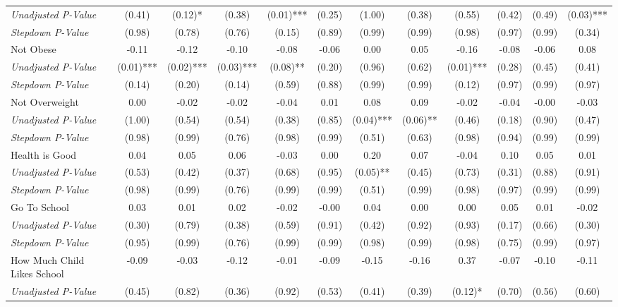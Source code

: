\begin{tabular}{l c c c c c c c c c c c}
\quad \textit{Unadjusted P-Value} & (0.41) & (0.12)* & (0.38) & (0.01)*** & (0.25) & (1.00) & (0.38) & (0.55) & (0.42) & (0.49) & (0.03)*** \\
\quad \textit{Stepdown P-Value} & (0.98) & (0.78) & (0.76) & (0.15) & (0.89) & (0.99) & (0.99) & (0.98) & (0.97) & (0.99) & (0.34) \\
Not Obese & -0.11 & -0.12 & -0.10 & -0.08 & -0.06 & 0.00 & 0.05 & -0.16 & -0.08 & -0.06 & 0.08 \\
\quad \textit{Unadjusted P-Value} & (0.01)*** & (0.02)*** & (0.03)*** & (0.08)** & (0.20) & (0.96) & (0.62) & (0.01)*** & (0.28) & (0.45) & (0.41) \\
\quad \textit{Stepdown P-Value} & (0.14) & (0.20) & (0.14) & (0.59) & (0.88) & (0.99) & (0.99) & (0.12) & (0.97) & (0.99) & (0.97) \\
Not Overweight & 0.00 & -0.02 & -0.02 & -0.04 & 0.01 & 0.08 & 0.09 & -0.02 & -0.04 & -0.00 & -0.03 \\
\quad \textit{Unadjusted P-Value} & (1.00) & (0.54) & (0.54) & (0.38) & (0.85) & (0.04)*** & (0.06)** & (0.46) & (0.18) & (0.90) & (0.47) \\
\quad \textit{Stepdown P-Value} & (0.98) & (0.99) & (0.76) & (0.98) & (0.99) & (0.51) & (0.63) & (0.98) & (0.94) & (0.99) & (0.99) \\
Health is Good & 0.04 & 0.05 & 0.06 & -0.03 & 0.00 & 0.20 & 0.07 & -0.04 & 0.10 & 0.05 & 0.01 \\
\quad \textit{Unadjusted P-Value} & (0.53) & (0.42) & (0.37) & (0.68) & (0.95) & (0.05)** & (0.45) & (0.73) & (0.31) & (0.88) & (0.91) \\
\quad \textit{Stepdown P-Value} & (0.98) & (0.99) & (0.76) & (0.99) & (0.99) & (0.51) & (0.99) & (0.98) & (0.97) & (0.99) & (0.99) \\
Go To School & 0.03 & 0.01 & 0.02 & -0.02 & -0.00 & 0.04 & 0.00 & 0.00 & 0.05 & 0.01 & -0.02 \\
\quad \textit{Unadjusted P-Value} & (0.30) & (0.79) & (0.38) & (0.59) & (0.91) & (0.42) & (0.92) & (0.93) & (0.17) & (0.66) & (0.30) \\
\quad \textit{Stepdown P-Value} & (0.95) & (0.99) & (0.76) & (0.99) & (0.99) & (0.98) & (0.99) & (0.98) & (0.75) & (0.99) & (0.97) \\
How Much Child Likes School & -0.09 & -0.03 & -0.12 & -0.01 & -0.09 & -0.15 & -0.16 & 0.37 & -0.07 & -0.10 & -0.11 \\
\quad \textit{Unadjusted P-Value} & (0.45) & (0.82) & (0.36) & (0.92) & (0.53) & (0.41) & (0.39) & (0.12)* & (0.70) & (0.56) & (0.60) \\

\end{tabular}
